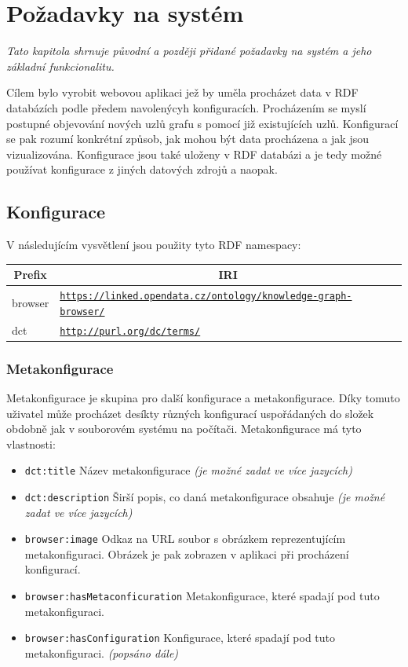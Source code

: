 \chapter{Požadavky na systém}
\textit{Tato kapitola shrnuje původní a později přidané požadavky na systém a jeho základní funkcionalitu.}

Cílem bylo vyrobit webovou aplikaci jež by uměla procházet data v RDF databázích podle předem navolenýcyh konfiguracích. Procházením se myslí postupné objevování nových uzlů grafu s pomocí již existujících uzlů. Konfigurací se pak rozumí konkrétní způsob, jak mohou být data procházena a jak jsou vizualizována. Konfigurace jsou také uloženy v RDF databázi a je tedy možné používat konfigurace z jiných datových zdrojů a naopak.

\section{Konfigurace}

V následujícím vysvětlení jsou použity tyto RDF namespacy:
\begin{table}[h] \centering
\begin{tabular}{lp{10cm}}
\toprule
\multicolumn{1}{c}{Prefix} & \multicolumn{1}{c}{IRI}                                      \\
\midrule
browser                    & \texttt{\url{https://linked.opendata.cz/ontology/knowledge-graph-browser/}} \\
dct                        & \texttt{\url{http://purl.org/dc/terms/}}
\end{tabular}
\end{table}

\subsection{Metakonfigurace} \label{pozadavky-metakonfigurace}
Metakonfigurace je skupina pro další konfigurace a metakonfigurace. Díky tomuto uživatel může procházet desíkty různých konfigurací uspořádaných do složek obdobně jak v souborovém systému na počítači. Metakonfigurace má tyto vlastnosti:

\begin{itemize}
    \item \texttt{dct:title} Název metakonfigurace \textit{(je možné zadat ve více jazycích)}
    \item \texttt{dct:description} Širší popis, co daná metakonfigurace obsahuje \textit{(je možné zadat ve více jazycích)}
    \item \texttt{browser:image} Odkaz na URL soubor s obrázkem reprezentujícím metakonfiguraci. Obrázek je pak zobrazen v aplikaci při procházení konfigurací.
    \item \texttt{browser:hasMetaconficuration} Metakonfigurace, které spadají pod tuto metakonfiguraci.
    \item \texttt{browser:hasConfiguration} Konfigurace, které spadají pod tuto metakonfiguraci. \textit{(popsáno dále)}
\end{itemize}

